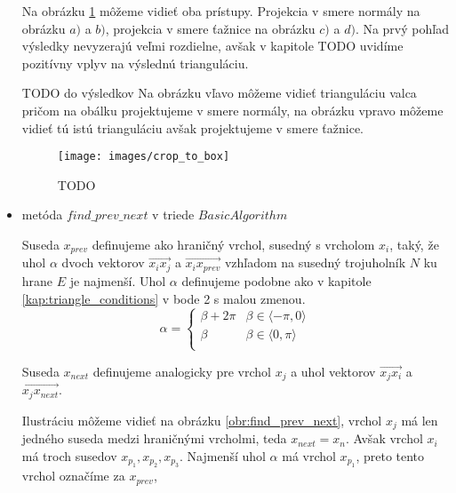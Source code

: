 \begin{itemize}
{        Na obrázku \ref{obr:crop_to_box} môžeme vidieť oba prístupy. Projekcia v smere normály 
        na obrázku $a)$ a $b)$, projekcia v smere ťažnice na obrázku $c)$ a $d)$. Na prvý pohľad 
        výsledky nevyzerajú veľmi rozdielne, avšak v kapitole TODO uvidíme pozitívny vplyv na výslednú 
        trianguláciu. 
        
        TODO do výsledkov
        Na obrázku vľavo môžeme vidieť trianguláciu valca pričom na obálku 
        projektujeme v smere normály, na obrázku vpravo môžeme vidieť tú istú trianguláciu 
        avšak projektujeme v smere ťažnice.

        \begin{figure}
            \centerline{\texttt{[image: images/crop\_to\_box]}}
            \caption[TODO]{TODO}
            \label{obr:crop_to_box}
        \end{figure}
    }
    \item{
        metóda $find\_prev\_next$ v triede $BasicAlgorithm$

        Suseda $x_{prev}$ definujeme ako 
                hraničný vrchol, susedný s vrcholom $x_i$, taký, že uhol $\alpha$ dvoch vektorov
                $\overrightarrow{x_i x_j}$ a $\overrightarrow{x_i x_{prev}}$ vzhľadom 
                na susedný trojuholník $N$ ku hrane $E$ je najmenší. Uhol $\alpha$ definujeme podobne
                ako v kapitole \ref{kap:triangle_conditions} v bode 2 s malou zmenou. 
                \[ 
                \alpha = \left\{
                \begin{array}{ll}
                    \beta + 2 \pi & \beta \in \langle -\pi, 0 \rangle\\
                    \beta & \beta \in \langle 0, \pi \rangle\\
                \end{array} 
                \right. 
                \]
                
                Suseda $x_{next}$ definujeme analogicky pre vrchol $x_j$ a uhol vektorov 
                $\overrightarrow{x_j x_i}$ a $\overrightarrow{x_j x_{next}}$.

                Ilustráciu môžeme vidieť na obrázku \ref{obr:find_prev_next}, vrchol $x_j$
                má len jedného suseda medzi hraničnými vrcholmi, teda $x_{next} = x_n$. 
                Avšak vrchol $x_i$ má troch
                susedov $x_{p_1}, x_{p_2}, x_{p_3}$. Najmenší uhol $\alpha$ má vrchol $x_{p_1}$,
                preto tento vrchol označíme za $x_{prev}$,

}
\end{itemize}

